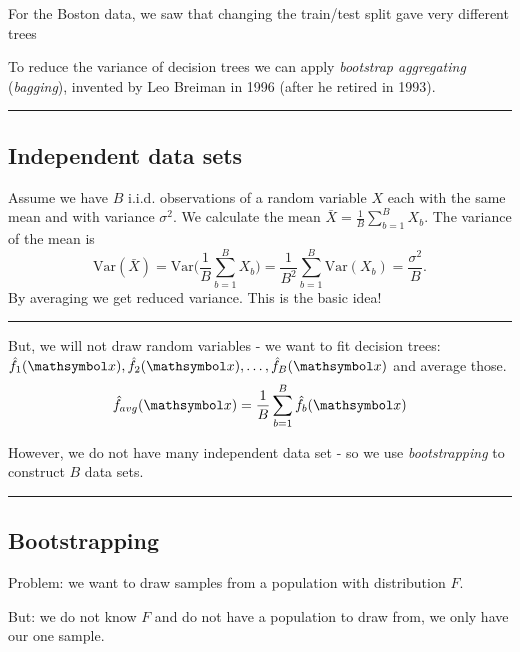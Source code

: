 \documentclass[
  letterpaper,
  DIV=11,
  numbers=noendperiod]{scrartcl}
\begin{document}
For the Boston data, we saw that changing the train/test split gave very
different trees

To reduce the variance of decision trees we can apply \emph{bootstrap
aggregating} (\emph{bagging}), invented by Leo Breiman in 1996 (after he
retired in 1993).

\begin{center}\rule{0.5\linewidth}{0.5pt}\end{center}

\hypertarget{independent-data-sets}{%
\subsection{Independent data sets}\label{independent-data-sets}}

Assume we have \(B\) i.i.d. observations of a random variable \(X\) each
with the same mean and with variance \(\sigma^2\). We calculate the mean
\(\bar{X} = \frac{1}{B} \sum_{b=1}^B X_b\). The variance of the mean is
\[\text{Var}(\bar{X}) = \text{Var}\Big(\frac{1}{B}\sum_{b=1}^B X_b \Big) = \frac{1}{B^2} \sum_{b=1}^B \text{Var}(X_b) = \frac{\sigma^2}{B}.\]
By averaging we get reduced variance. This is the basic idea!

\begin{center}\rule{0.5\linewidth}{0.5pt}\end{center}

But, we will not draw random variables - we want to fit decision trees:
\(\hat{f}_1({\mathsymbol x}),\hat{f}_2({\mathsymbol x}),\ldots, \hat{f}_B({\mathsymbol x})\)
and average those.
\[ \hat{f}_{avg}({\mathsymbol x})=\frac{1}{B}\sum_{b=1}^B \hat{f}_b({\mathsymbol x})\]

However, we do not have many independent data set - so we use
\emph{bootstrapping} to construct \(B\) data sets.

\begin{center}\rule{0.5\linewidth}{0.5pt}\end{center}

\hypertarget{bootstrapping}{%
\subsection{Bootstrapping}\label{bootstrapping}}

Problem: we want to draw samples from a population with distribution
\(F\).

But: we do not know \(F\) and do not have a population to draw from, we
only have our one sample.
\end{document}
